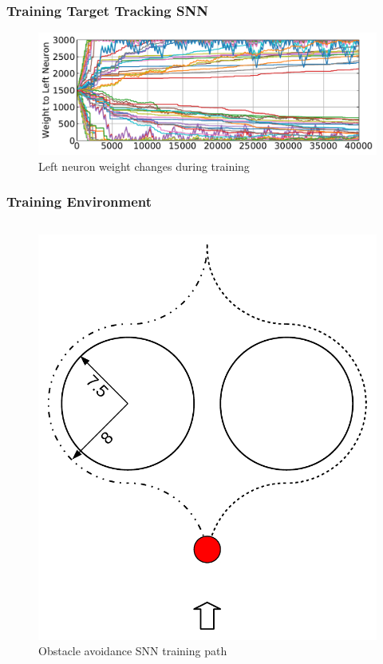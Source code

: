 \begin{frame}
	\frametitle{Training Target Tracking SNN}
	\begin{figure}
		\centering
		\includegraphics[width=\textwidth]{img/weight_change_left_tf.pdf}
		\caption{Left neuron weight changes during training}
		\label{fig:tf_weight_changes_left}
	\end{figure}
\end{frame}

\begin{frame}
	\frametitle{Training Environment}
	\begin{columns}
		\column{\linewidth}
			\begin{overprint}
				\begin{figure}
					\centering
					\includegraphics[height=0.6\textheight]{img/oa_training_path.pdf}
					\caption{Obstacle avoidance SNN training path}
					\label{fig:oa_training_path}
				\end{figure}
			\end{overprint}
	\end{columns}
\end{frame}

